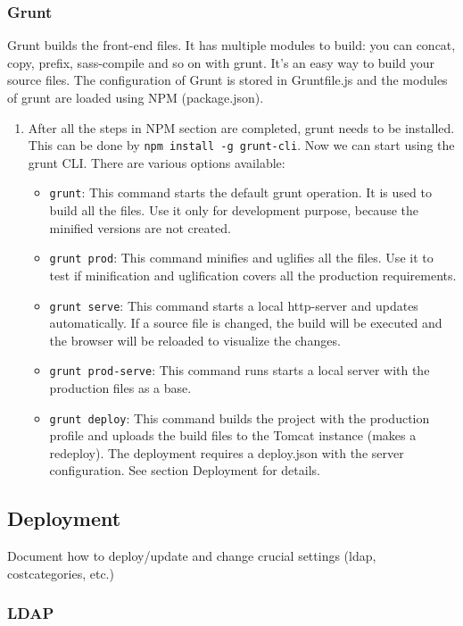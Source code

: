 \subsubsection{Grunt}
Grunt builds the front-end files. It has multiple modules to build: you can concat, copy, prefix, sass-compile and so on with grunt. It’s an easy way to build your source files. The configuration of Grunt is stored in Gruntfile.js and the modules of grunt are loaded using NPM (package.json).
\begin{enumerate}
  \item After all the steps in NPM section are completed, grunt needs to be installed. This can be done by \texttt{npm install -g grunt-cli}. Now we can start using the grunt CLI. There are various options available:
  \begin{itemize}
      \item \texttt{grunt}: This command starts the default grunt operation. It is used to build all the files. Use it only for development purpose, because the minified versions are not created.
      \item \texttt{grunt prod}: This command minifies and uglifies all the files. Use it to test if minification and uglification covers all the production requirements.
      \item \texttt{grunt serve}: This command starts a local http-server and updates automatically. If a source file is changed, the build will be executed and the browser will be reloaded to visualize the changes.
      \item \texttt{grunt prod-serve}: This command runs starts a local server with the production files as a base.
      \item \texttt{grunt deploy}: This command builds the project with the production profile and uploads the build files to the Tomcat instance (makes a redeploy). The deployment requires a deploy.json with the server configuration. See section Deployment for details.
    \end{itemize}
\end{enumerate}

\subsection{Deployment}

Document how to deploy/update and change crucial settings (ldap, costcategories, etc.)

\subsubsection{LDAP}
\label{subsubsec:ldap}

